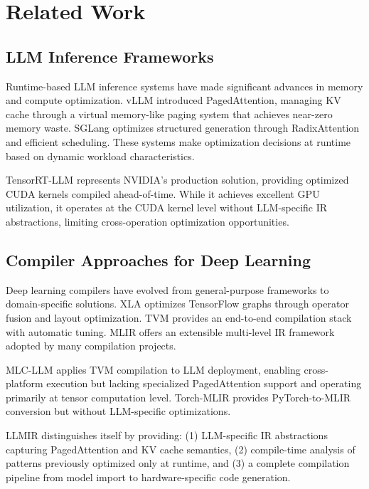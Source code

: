 \documentclass[conference]{IEEEtran}
\begin{document}
\section{Related Work}

\subsection{LLM Inference Frameworks}

Runtime-based LLM inference systems have made significant advances in memory and compute optimization. vLLM \cite{b3} introduced PagedAttention, managing KV cache through a virtual memory-like paging system that achieves near-zero memory waste. SGLang \cite{b4} optimizes structured generation through RadixAttention and efficient scheduling. These systems make optimization decisions at runtime based on dynamic workload characteristics.

TensorRT-LLM \cite{b10} represents NVIDIA's production solution, providing optimized CUDA kernels compiled ahead-of-time. While it achieves excellent GPU utilization, it operates at the CUDA kernel level without LLM-specific IR abstractions, limiting cross-operation optimization opportunities.

\subsection{Compiler Approaches for Deep Learning}

Deep learning compilers have evolved from general-purpose frameworks to domain-specific solutions. XLA \cite{b13} optimizes TensorFlow graphs through operator fusion and layout optimization. TVM \cite{b14} provides an end-to-end compilation stack with automatic tuning. MLIR \cite{b5} offers an extensible multi-level IR framework adopted by many compilation projects.

MLC-LLM \cite{b15} applies TVM compilation to LLM deployment, enabling cross-platform execution but lacking specialized PagedAttention support and operating primarily at tensor computation level. Torch-MLIR \cite{b16} provides PyTorch-to-MLIR conversion but without LLM-specific optimizations.

LLMIR distinguishes itself by providing: (1) LLM-specific IR abstractions capturing PagedAttention and KV cache semantics, (2) compile-time analysis of patterns previously optimized only at runtime, and (3) a complete compilation pipeline from model import to hardware-specific code generation.
\end{document}
